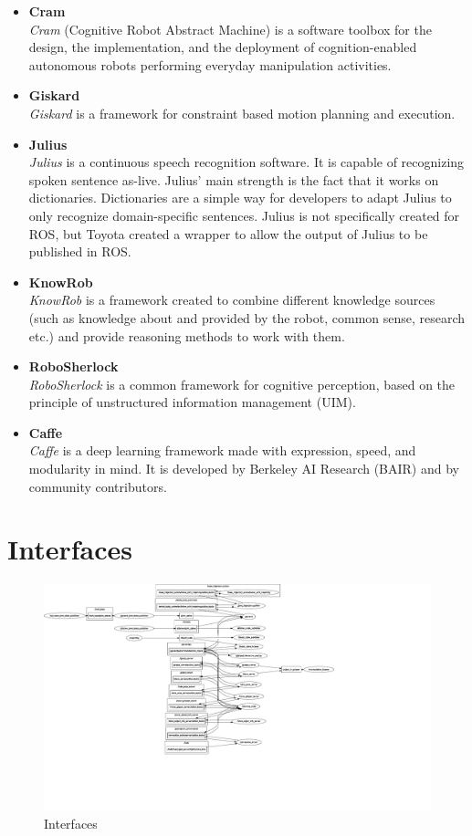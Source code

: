 \documentclass[main.tex]{subfiles}
\begin{document}
			\begin{itemize}
				\item{\textbf{Cram}} \\
					 \textit{Cram} (Cognitive Robot Abstract Machine) is a software toolbox for the design, the implementation, and the deployment of cognition-enabled autonomous robots performing everyday manipulation activities.
				\item{\textbf{Giskard}} \\
					\textit{Giskard} is a  framework for constraint based motion planning and execution.
				\item{\textbf{Julius}} \\
					\textit{Julius} is a continuous speech recognition software. It is capable of recognizing spoken sentence as-live. Julius' main strength is the fact that it works on dictionaries. Dictionaries are a simple way for developers to adapt Julius to only recognize domain-specific sentences. Julius is not specifically created for ROS, but Toyota created a wrapper to allow the output of Julius to be published in ROS.
				\item{\textbf{KnowRob}} \\
				    \textit{KnowRob} is a framework created to combine different knowledge sources (such as knowledge about and provided by the robot, common sense, research etc.) and provide reasoning methods to work with them. 
				\item{\textbf{RoboSherlock}} \\
					\textit{RoboSherlock} is a common framework for cognitive perception, based on the principle of unstructured information management (UIM).
				\item{\textbf{Caffe}} \\
					\textit{Caffe} is a deep learning framework made with expression, speed, and modularity in mind. It is developed by Berkeley AI Research (BAIR) and by community contributors.
			\end{itemize}
			
	

		
		\section{Interfaces}
		
		\begin{figure}[H]
			\centering
			\includegraphics[width=1.5\textwidth]{pictures/diagramms/rosgraph}
			\caption{Interfaces}
			\label{interfaces}
		\end{figure}
\end{document}
